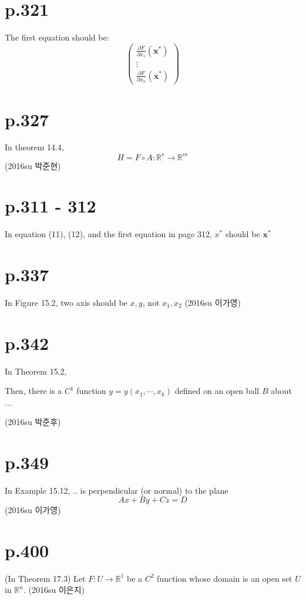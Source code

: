 \documentclass[a4paper]{article}
\begin{document}
\section{p.321}
The first equation should be: \[
\begin{pmatrix}
	\frac{\partial F}{\partial x_1}(\mathbf{x}^\ast)\\
	\vdots\\
	\frac{\partial F}{\partial x_n}(\mathbf{x}^\ast)
\end{pmatrix}
\]

\section{p.327} %
\label{sec:p_327}
In theorem 14.4,
\[
	H = F \circ A : \mathbb{R}^s \rightarrow \mathbb{R}^m
\]
(2016su 박준현)

\section{p.311 - 312} %
\label{sec:p_311}
In equation (11), (12), and the first equation in page 312, $x^\ast$ should be $\mathbf{x}^\ast$

\section{p.337} %
\label{sec:p_337}
In Figure 15.2, two axis should be $x,y$, not $x_1, x_2$ (2016su 이가영)

\section{p.342} %
\label{sec:p_342}
In Theorem 15.2,

Then, there is a $C^1$ function $y=y(x_1,\cdots,x_k)$ defined on an open ball $B$ about ...

(2016su 박준후)

\section{p.349} %
\label{sec:p_349}
In Example 15.12, .. is perpendicular (or normal) to the plane\[
	Ax+By+Cz=D
\](2016su 이가영)

\section{p.400} %
\label{sec:p_400}
(In Theorem 17.3) Let $F:U\rightarrow \mathbb{R}^1$ be a $C^2$ function whose domain is an open set $U$ in $\mathbb{R}^n$.
(2016su 이은지)
\end{document}
